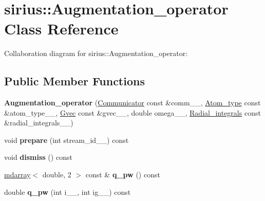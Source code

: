 \hypertarget{classsirius_1_1_augmentation__operator}{}\section{sirius\+:\+:Augmentation\+\_\+operator Class Reference}
\label{classsirius_1_1_augmentation__operator}


Collaboration diagram for sirius\+:\+:Augmentation\+\_\+operator\+:
\subsection*{Public Member Functions}
\begin{DoxyCompactItemize}
\item 
\hypertarget{classsirius_1_1_augmentation__operator_aef63edb6fda364c2f7c3200d96a62e29}{}{\bfseries Augmentation\+\_\+operator} (\hyperlink{classsddk_1_1_communicator}{Communicator} const \&comm\+\_\+\+\_\+, \hyperlink{classsirius_1_1_atom__type}{Atom\+\_\+type} const \&atom\+\_\+type\+\_\+\+\_\+, \hyperlink{classsddk_1_1_gvec}{Gvec} const \&gvec\+\_\+\+\_\+, double omega\+\_\+\+\_\+, \hyperlink{classsirius_1_1_radial__integrals}{Radial\+\_\+integrals} const \&radial\+\_\+integrals\+\_\+\+\_\+)\label{classsirius_1_1_augmentation__operator_aef63edb6fda364c2f7c3200d96a62e29}

\item 
\hypertarget{classsirius_1_1_augmentation__operator_a352a0b5aee5b7f5679b62c85c8d86020}{}void {\bfseries prepare} (int stream\+\_\+id\+\_\+\+\_\+) const \label{classsirius_1_1_augmentation__operator_a352a0b5aee5b7f5679b62c85c8d86020}

\item 
\hypertarget{classsirius_1_1_augmentation__operator_af5c3435ec80a2d03ca85cf945828a169}{}void {\bfseries dismiss} () const \label{classsirius_1_1_augmentation__operator_af5c3435ec80a2d03ca85cf945828a169}

\item 
\hypertarget{classsirius_1_1_augmentation__operator_a31b77781b462d27669fa01d1f929847c}{}\hyperlink{classsddk_1_1mdarray}{mdarray}$<$ double, 2 $>$ const \& {\bfseries q\+\_\+pw} () const \label{classsirius_1_1_augmentation__operator_a31b77781b462d27669fa01d1f929847c}

\item 
\hypertarget{classsirius_1_1_augmentation__operator_a3865ec63ff4d57442821946c8de9c468}{}double {\bfseries q\+\_\+pw} (int i\+\_\+\+\_\+, int ig\+\_\+\+\_\+) const \label{classsirius_1_1_augmentation__operator_a3865ec63ff4d57442821946c8de9c468}


\end{DoxyCompactItemize}
